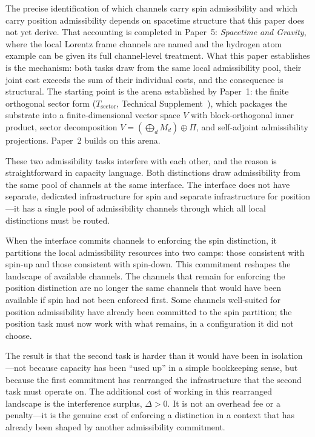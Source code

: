 \documentclass[11pt]{article}
\begin{document}
The precise identification of which channels carry spin admissibility and which carry position admissibility depends on spacetime structure that this paper does not yet derive.  That accounting is completed in Paper~5: \emph{Spacetime and Gravity}, where the local Lorentz frame channels are named and the hydrogen atom example can be given its full channel-level treatment.  What this paper establishes is the mechanism: both tasks draw from the same local admissibility pool, their joint cost exceeds the sum of their individual costs, and the consequence is structural.  The starting point is the arena established by Paper~1: the finite orthogonal sector form ($T_{\mathrm{sector}}$, Technical Supplement~\cite{BrookeSupplement}), which packages the substrate into a finite-dimensional vector space $V$ with block-orthogonal inner product, sector decomposition $V = (\bigoplus_d M_d) \oplus \Pi$, and self-adjoint admissibility projections.  Paper~2 builds on this arena.

These two admissibility tasks interfere with each other, and the reason is straightforward in capacity language.  Both distinctions draw admissibility from the same pool of channels at the same interface.  The interface does not have separate, dedicated infrastructure for spin and separate infrastructure for position---it has a single pool of admissibility channels through which all local distinctions must be routed.

When the interface commits channels to enforcing the spin distinction, it partitions the local admissibility resources into two camps: those consistent with spin-up and those consistent with spin-down.  This commitment reshapes the landscape of available channels.  The channels that remain for enforcing the position distinction are no longer the same channels that would have been available if spin had not been enforced first.  Some channels well-suited for position admissibility have already been committed to the spin partition; the position task must now work with what remains, in a configuration it did not choose.

The result is that the second task is harder than it would have been in isolation---not because capacity has been ``used up'' in a simple bookkeeping sense, but because the first commitment has rearranged the infrastructure that the second task must operate on.  The additional cost of working in this rearranged landscape is the interference surplus, $\Delta > 0$.  It is not an overhead fee or a penalty---it is the genuine cost of enforcing a distinction in a context that has already been shaped by another admissibility commitment.
\end{document}
